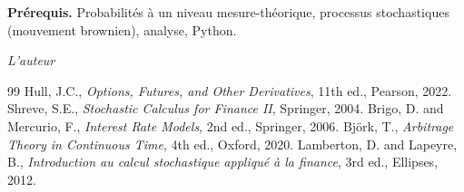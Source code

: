 \documentclass[12pt,a4paper,twoside]{book}
\theoremstyle{definition}
\theoremstyle{plain}
\theoremstyle{remark}
\begin{document}
\medskip

\noindent\textbf{Pr\'erequis.} Probabilit\'es \`a un niveau mesure-th\'eorique, processus stochastiques (mouvement brownien), analyse, Python.

\vfill
\hfill\textit{L'auteur}


\mainmatter














\backmatter
\begin{thebibliography}{99}
 Hull, J.C., \emph{Options, Futures, and Other Derivatives}, 11th ed., Pearson, 2022.
 Shreve, S.E., \emph{Stochastic Calculus for Finance II}, Springer, 2004.
 Brigo, D. and Mercurio, F., \emph{Interest Rate Models}, 2nd ed., Springer, 2006.
 Bj\"ork, T., \emph{Arbitrage Theory in Continuous Time}, 4th ed., Oxford, 2020.
 Lamberton, D. and Lapeyre, B., \emph{Introduction au calcul stochastique appliqu\'e \`a la finance}, 3rd ed., Ellipses, 2012.
\end{thebibliography}
\printindex
\end{document}
